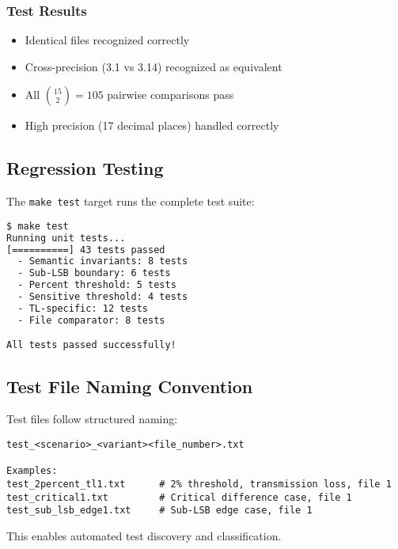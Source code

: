 \subsubsection{Test Results}

\begin{itemize}
    \item \checkmark{} Identical files recognized correctly
    \item \checkmark{} Cross-precision (3.1 vs 3.14) recognized as equivalent
    \item \checkmark{} All $\binom{15}{2} = 105$ pairwise comparisons pass
    \item \checkmark{} High precision (17 decimal places) handled correctly
\end{itemize}

\subsection{Regression Testing}

The \texttt{make test} target runs the complete test suite:

\begin{lstlisting}[language=bash]
$ make test
Running unit tests...
[==========] 43 tests passed
  - Semantic invariants: 8 tests
  - Sub-LSB boundary: 6 tests
  - Percent threshold: 5 tests
  - Sensitive threshold: 4 tests
  - TL-specific: 12 tests
  - File comparator: 8 tests

All tests passed successfully!
\end{lstlisting}

\subsection{Test File Naming Convention}

Test files follow structured naming:

\begin{verbatim}
test_<scenario>_<variant><file_number>.txt

Examples:
test_2percent_tl1.txt      # 2% threshold, transmission loss, file 1
test_critical1.txt         # Critical difference case, file 1
test_sub_lsb_edge1.txt     # Sub-LSB edge case, file 1
\end{verbatim}

This enables automated test discovery and classification.
